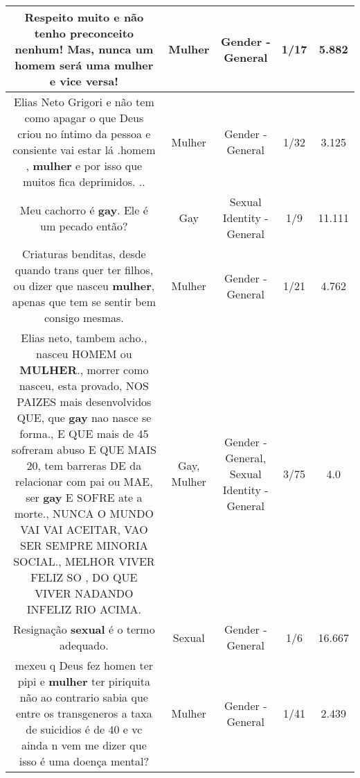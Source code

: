 \documentclass[11pt]{article}
\newlength\mylength
\begin{document}
\begin{center}
\begin{longtable}{|C{.65\mylength}|C{.30\mylength}|C{.12\mylength}|C{.12\mylength}|C{.12\mylength}|}
  \small Respeito muito e não tenho preconceito nenhum! Mas, nunca um homem será uma \textbf{mulher} e vice versa!\normalsize   & Mulher & Gender - General & 1/17 & 5.882 \\  \hline
  \small Elias Neto Grigori e não tem como apagar o que Deus criou no íntimo da pessoa e consiente vai estar lá .homem , \textbf{mulher} e por isso que muitos fica deprimidos. ..\normalsize   & Mulher & Gender - General & 1/32 & 3.125 \\  \hline
  \small Meu cachorro é \textbf{gay}. Ele é um pecado então?\normalsize   & Gay & Sexual Identity - General & 1/9 & 11.111 \\  \hline
  \small Criaturas benditas, desde quando trans quer ter filhos, ou dizer que nasceu \textbf{mulher}, apenas que tem se sentir bem consigo mesmas.\normalsize   & Mulher & Gender - General & 1/21 & 4.762 \\  \hline
  \small Elias neto, tambem acho., nasceu HOMEM ou \textbf{MULHER}., morrer como nasceu,  esta provado,  NOS PAIZES mais desenvolvidos QUE, que \textbf{gay} nao nasce se forma., E QUE mais de 45 sofreram abuso E QUE MAIS 20, tem barreras DE da relacionar com pai ou MAE,  ser \textbf{gay} E SOFRE ate a morte., NUNCA O MUNDO VAI VAI ACEITAR,  VAO SER SEMPRE MINORIA SOCIAL., MELHOR VIVER FELIZ SO , DO QUE VIVER NADANDO INFELIZ RIO ACIMA.\normalsize   & Gay, Mulher & Gender - General, Sexual Identity - General & 3/75 & 4.0 \\  \hline
  \small Resignação \textbf{sexual} é o termo adequado.\normalsize   & Sexual & Gender - General & 1/6 & 16.667 \\  \hline
  \small {} mexeu q Deus fez homen ter pipi e \textbf{mulher} ter piriquita não ao contrario sabia que entre os transgeneros a taxa de suicidios é de 40 e vc ainda n vem me dizer que isso é uma doença mental?\normalsize   & Mulher & Gender - General & 1/41 & 2.439 \\  \hline

\end{longtable}
\end{center}
\end{document}
